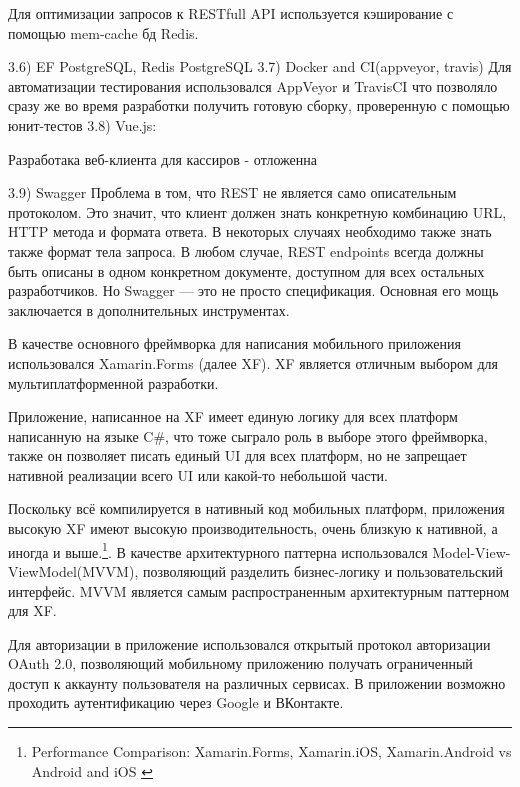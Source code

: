 \documentclass[14pt]{matmex-diploma-custom}
\begin{document}
        Для оптимизации запросов к RESTfull API используется кэширование с помощью mem-cache бд Redis\cite{redis_dotnet_doc}.
        
        3.6) EF PostgreSQL, Redis
        PostgreSQL
        3.7) Docker and CI(appveyor, travis)
        Для автоматизации тестирования использовался AppVeyor и TravisCI что позволяло сразу же во время разработки получить готовую сборку, проверенную с помощью юнит-тестов
        3.8) Vue.js:
        
        Разработака веб-клиента для кассиров - отложенна
        
        3.9) Swagger
        Проблема в том, что REST не является само описательным протоколом.
        Это значит, что клиент должен знать конкретную комбинацию URL, HTTP метода и формата ответа.
        В некоторых случаях необходимо также знать также формат тела запроса.
        В любом случае, REST endpoints всегда должны быть описаны в одном конкретном документе, доступном для всех остальных разработчиков.
        Но Swagger — это не просто спецификация. Основная его мощь заключается в дополнительных инструментах.

        В качестве основного фреймворка для написания мобильного приложения использовался Xamarin.Forms (далее XF).
        XF является отличным выбором для мультиплатформенной разработки.

        Приложение, написанное на XF имеет единую логику для всех платформ написанную на языке C\#,
        что тоже сыграло роль в выборе этого фреймворка, также он позволяет писать единый UI для всех платформ,
        но не запрещает нативной реализации всего UI или какой-то небольшой части.

        Поскольку всё компилируется в нативный код мобильных платформ, приложения высокую XF имеют высокую производительность,
        очень близкую к нативной, а иногда и выше.\footnote{Performance Comparison: Xamarin.Forms, Xamarin.iOS, Xamarin.Android vs Android and iOS \cite{perf_compar_2}}.
        В качестве архитектурного паттерна использовался Model-View-ViewModel(MVVM)\cite{MVVM_wiki},
        позволяющий разделить бизнес-логику и пользовательский интерфейс.
        MVVM является самым распространенным архитектурным паттерном для XF.

        Для авторизации в приложение использовался открытый протокол авторизации OAuth 2.0, позволяющий мобильному приложению получать ограниченный доступ к аккаунту пользователя на различных сервисах.
        В приложении возможно проходить аутентификацию через Google и ВКонтакте.
\end{document}
